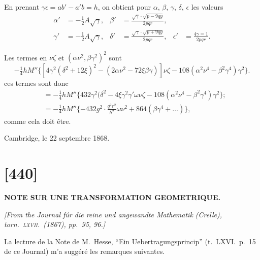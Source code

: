 \documentclass[11pt,a4paper]{article}
\begin{document}
En prenant $\gamma\epsilon = ab' - a'b = h$, on obtient pour $\alpha$, $\beta$, $\gamma$, $\delta$, $\epsilon$ les valeurs
\begin{align*}
\alpha' &= -\tfrac{1}{2}A\sqrt{\gamma}, & \beta' &= \frac{\sqrt{\gamma}\cdot\sqrt{p - 9qy}}{2pqr}, \\
\gamma' &= -\tfrac{1}{2}A\sqrt{\gamma}, & \delta' &= \frac{\sqrt{\gamma}\cdot\sqrt{p + 9qy}}{2pqr}, & \epsilon' &= \frac{4\gamma = 1}{2pqr}.
\end{align*}

Les termes en $\nu\zeta$ et $(\alpha\nu^2, \beta\gamma^2)^2$ sont
\[
-\tfrac{1}{4}h M'' \{[4\gamma^2 (\delta^2 + 12\xi)^2 - (2\alpha\nu^2 - 72\xi\beta\gamma)]\nu\zeta - 108(\alpha^2\nu^4 - \beta^2\gamma^4)\gamma^2\}.
\]
ces termes sont donc
\begin{align*}
&= -\tfrac{1}{4} h M'' \{432\gamma^2(\delta^2 - 4\xi\gamma^2\gamma'\omega\nu\zeta - 108(\alpha^2\nu^4 - \beta^2\gamma^4)\gamma^2\}; \\
&= -\tfrac{1}{4} h M'' \{-432g^2 \cdot \tfrac{q^2 r^2}{h^2} \omega\nu^2 + 864(\beta\gamma^4 + \ldots)\},
\end{align*}
comme cela doit \^{e}tre.

Cambridge, le 22 septembre 1868.

\newpage
\section*{[440]}

\begin{center}
\textbf{\Large NOTE SUR UNE TRANSFORMATION GEOMETRIQUE.}
\end{center}

\begin{flushright}
\textit{[From the \textit{Journal f\'{u}r die reine und angewandte Mathematik} (Crelle),}\\
\textit{torn.\ \textsc{lxvii}.\ (1867), pp.\ 95, 96.]}
\end{flushright}

\vspace{1em}

\noindent
La lecture de la Note de M.~Hesse, ``Ein Uebertragungsprincip'' (t.\ LXVI.\ p.\ 15 de ce Journal) m'a sugg\'{e}r\'{e} les remarques suivantes.
\end{document}
